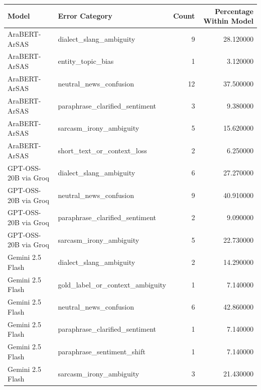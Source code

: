 \begin{tabular}{llrr}
\toprule
Model & Error Category & Count & Percentage Within Model \\
\midrule
AraBERT-ArSAS & dialect_slang_ambiguity & 9 & 28.120000 \\
AraBERT-ArSAS & entity_topic_bias & 1 & 3.120000 \\
AraBERT-ArSAS & neutral_news_confusion & 12 & 37.500000 \\
AraBERT-ArSAS & paraphrase_clarified_sentiment & 3 & 9.380000 \\
AraBERT-ArSAS & sarcasm_irony_ambiguity & 5 & 15.620000 \\
AraBERT-ArSAS & short_text_or_context_loss & 2 & 6.250000 \\
GPT-OSS-20B via Groq & dialect_slang_ambiguity & 6 & 27.270000 \\
GPT-OSS-20B via Groq & neutral_news_confusion & 9 & 40.910000 \\
GPT-OSS-20B via Groq & paraphrase_clarified_sentiment & 2 & 9.090000 \\
GPT-OSS-20B via Groq & sarcasm_irony_ambiguity & 5 & 22.730000 \\
Gemini 2.5 Flash & dialect_slang_ambiguity & 2 & 14.290000 \\
Gemini 2.5 Flash & gold_label_or_context_ambiguity & 1 & 7.140000 \\
Gemini 2.5 Flash & neutral_news_confusion & 6 & 42.860000 \\
Gemini 2.5 Flash & paraphrase_clarified_sentiment & 1 & 7.140000 \\
Gemini 2.5 Flash & paraphrase_sentiment_shift & 1 & 7.140000 \\
Gemini 2.5 Flash & sarcasm_irony_ambiguity & 3 & 21.430000 \\
\bottomrule
\end{tabular}
